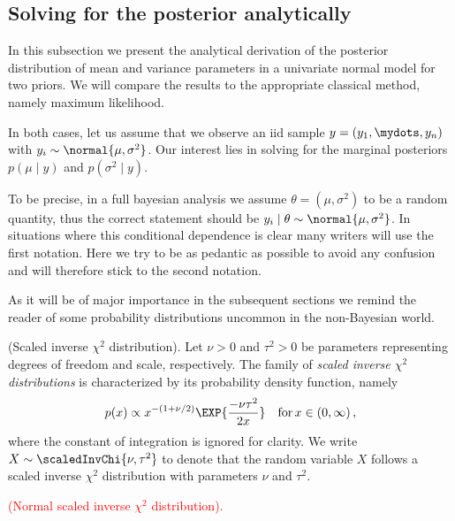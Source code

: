 \subsection{Solving for the posterior analytically}
In this subsection we present the analytical derivation of the posterior distribution of mean and variance parameters in a univariate normal model for two priors.
We will compare the results to the appropriate classical method, namely maximum likelihood.

In both cases, let us assume that we observe an iid sample $y = (y_1, \mydots, y_n)$
with $y_i \sim \normal{\mu, \sigma^2}$.
Our interest lies in solving for the marginal posteriors $p(\mu \mid y)$ and $p(\sigma^2 \mid y)$.

To be precise, in a full bayesian analysis we assume $\theta = (\mu, \sigma^2)$ to be a random quantity, thus the correct statement should be $y_i \mid \theta \sim \normal{\mu, \sigma^2}$.
In situations where this conditional dependence is clear many writers will use the first notation.
Here we try to be as pedantic as possible to avoid any confusion and will therefore stick to the second notation.

As it will be of major importance in the subsequent sections we remind the reader of some probability distributions uncommon in the non-Bayesian world.

\begin{definition}{(Scaled inverse $\chi^2$ distribution).}
  Let $\nu > 0$ and $\tau^2 > 0$ be parameters representing degrees of freedom and scale, respectively. The family of \emph{scaled inverse $\chi^2$ distributions} is characterized by its probability density function, namely
  \begin{align}
    p(x) \propto x^{-(1 + \nu / 2)} \EXP{\frac{-\nu \tau^2}{2 x}} \quad \text{for} \, x \in (0, \infty) \,,
  \end{align}
  where the constant of integration is ignored for clarity.
  We write $X \sim \scaledInvChi{\nu, \tau^2}$ to denote that the random variable $X$ follows a scaled inverse $\chi^2$ distribution with parameters $\nu$ and $\tau^2$.
\end{definition}

\textcolor{red}{
\begin{definition}{(Normal scaled inverse $\chi^2$ distribution).}
\end{definition}
}

